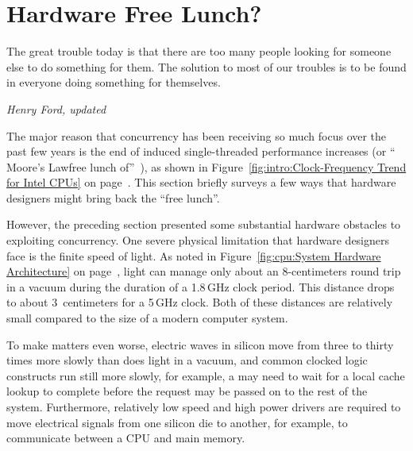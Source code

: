 
\section{Hardware Free Lunch?}
\label{sec:cpu:Hardware Free Lunch?}
%
\epigraph{The great trouble today is that there are too many people looking
	  for someone else to do something for them.
	  The solution to most of our troubles is to be found in everyone
	  doing something for themselves.}
	 {\emph{Henry Ford, updated}}

The major reason that concurrency has been receiving so much focus over
the past few years is the end of 
induced single-threaded
performance increases
(or ``%
{Moore's Law}{free lunch of}''~\cite{HerbSutter2008EffectiveConcurrency}),
as shown in
Figure~\ref{fig:intro:Clock-Frequency Trend for Intel CPUs} on
page~\pageref{fig:intro:Clock-Frequency Trend for Intel CPUs}.
This section briefly surveys a few ways that hardware designers
might bring back the ``free lunch''.

However, the preceding section presented some substantial hardware
obstacles to exploiting concurrency.
One severe physical limitation that hardware designers face is the
finite speed of light.
As noted in
Figure~\ref{fig:cpu:System Hardware Architecture} on
page~\pageref{fig:cpu:System Hardware Architecture},
light can manage only about an 8-centimeters round trip in a vacuum
during the duration of a 1.8\,GHz clock period.
This distance drops to about 3~centimeters for a 5\,GHz clock.
Both of these distances are relatively small compared to the size
of a modern computer system.

To make matters even worse, electric waves in silicon move from three to
thirty times more slowly than does light in a vacuum, and common
clocked logic constructs run still more slowly, for example, a
may need to wait for a local cache lookup to complete
before the request may be passed on to the rest of the system.
Furthermore, relatively low speed and high power drivers are required
to move electrical signals from one silicon die to another, for example,
to communicate between a CPU and main memory.

